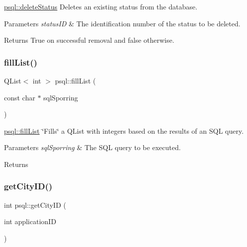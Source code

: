 \hyperlink{classpsql_a26fc592cfb9f484e1bee62af527f2b95}{psql\+::delete\+Status} Deletes an existing status from the database. 


\begin{DoxyParams}{Parameters}
{\em status\+ID} & The identification number of the status to be deleted. \\
\hline
\end{DoxyParams}
\begin{DoxyReturn}{Returns}
True on successful removal and false otherwise. 
\end{DoxyReturn}
\mbox{\label{classpsql_a9a3082a159c962dfcd84e23930f5619b}} 
\subsubsection{\texorpdfstring{fill\+List()}{fillList()}}
{\footnotesize\ttfamily Q\+List$<$ int $>$ psql\+::fill\+List (\begin{DoxyParamCaption}\item[{const char $\ast$}]{sql\+Sporring }\end{DoxyParamCaption})}



\hyperlink{classpsql_a9a3082a159c962dfcd84e23930f5619b}{psql\+::fill\+List} \char`\"{}\+Fills\char`\"{} a Q\+List with integers based on the results of an S\+QL query. 


\begin{DoxyParams}{Parameters}
{\em sql\+Sporring} & The S\+QL query to be executed. \\
\hline
\end{DoxyParams}
\begin{DoxyReturn}{Returns}

\end{DoxyReturn}
\mbox{\label{classpsql_af3462a12dc106e0ca8df4fa8fcf28436}} 
\subsubsection{\texorpdfstring{get\+City\+I\+D()}{getCityID()}}
{\footnotesize\ttfamily int psql\+::get\+City\+ID (\begin{DoxyParamCaption}\item[{int}]{application\+ID }\end{DoxyParamCaption})}



